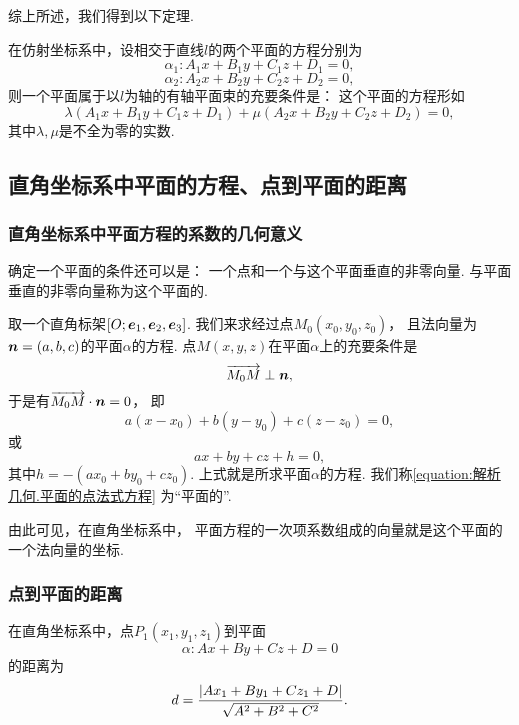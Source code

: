 综上所述，我们得到以下定理.
\begin{theorem}
在仿射坐标系中，设相交于直线\(l\)的两个平面的方程分别为\[
	\alpha_1: A_1 x + B_1 y + C_1 z + D_1 = 0,
\]\[
	\alpha_2: A_2 x + B_2 y + C_2 z + D_2 = 0,
\]
则一个平面属于以\(l\)为轴的有轴平面束的充要条件是：
这个平面的方程形如\[
	\lambda	(A_1 x + B_1 y + C_1 z + D_1)
	+ \mu	(A_2 x + B_2 y + C_2 z + D_2) = 0,
\]
其中\(\lambda,\mu\)是不全为零的实数.
\end{theorem}

\subsection{直角坐标系中平面的方程、点到平面的距离}

\subsubsection{直角坐标系中平面方程的系数的几何意义}
确定一个平面的条件还可以是：
一个点和一个与这个平面垂直的非零向量.
与平面垂直的非零向量称为这个平面的.

取一个直角标架\([O;\boldsymbol{e}_1,\boldsymbol{e}_2,\boldsymbol{e}_3]\).
我们来求经过点\(M_0(x_0,y_0,z_0)\)，
且法向量为\(\boldsymbol{n}=(a,b,c)\)的平面\(\alpha\)的方程.
点\(M(x,y,z)\)在平面\(\alpha\)上的充要条件是\[
	\overrightarrow{M_0 M} \perp \boldsymbol{n},
\]
于是有\(\overrightarrow{M_0 M} \cdot \boldsymbol{n} = 0\)，
即\begin{equation}\label{equation:解析几何.平面的点法式方程}
	a(x-x_0) + b(y-y_0) + c(z-z_0) = 0,
\end{equation}
或\[
	a x + b y + c z + h = 0,
\]其中\(h=-(a x_0 + b y_0 + c z_0)\).
上式就是所求平面\(\alpha\)的方程.
我们称\cref{equation:解析几何.平面的点法式方程} 为“平面的”.

由此可见，在直角坐标系中，
平面方程的一次项系数组成的向量就是这个平面的一个法向量的坐标.

\subsubsection{点到平面的距离}
\begin{theorem}
在直角坐标系中，点\(P_1(x_1,y_1,z_1)\)到平面\[
	\alpha: A x + B y + C z + D = 0
\]的距离为
\begin{equation}
	d = \frac{\abs{A x_1 + B y_1 + C z_1 + D}}{\sqrt{A^2 + B^2 + C^2}}.
\end{equation}
\end{theorem}

